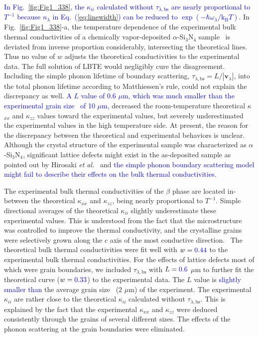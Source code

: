 \documentclass[twocolumn,amsmath,amssymb,a4paper,prb,superscriptaddress,floatfix]{revtex4-1}
\begin{document}
\textcolor {blue}{In Fig.~\ref{fig:Fig1_338}, the $\kappa_{ii}$ calculated
without $\tau_{\lambda,\text{bs}}$ are nearly proportional to $T^{-1}$ because
$n_\lambda$ in Eq.~(\ref{eq:linewidth}) can be reduced to
$\exp(-\hbar\omega_\lambda/\mathrm{k_B}T)$.} In Fig.~\ref{fig:Fig1_338}-a, the
temperature dependence of the experimental bulk thermal conductivities of a
chemically vapor-deposited $\alpha$-Si$_3$N$_4$ sample~\cite{hirai} is deviated
from inverse proportion considerably, intersecting the theoretical lines.  Thus
no value of $w$ adjusts the theoretical conductivities to the experimental
data.  The full solution of LBTE would negligibly cure the disagreement.
Including the simple phonon lifetime of boundary scattering,
$\tau_{\lambda,\text{bs}}=L/|\mathbf{v}_\lambda|$, into the total phonon
lifetime according to Matthiessen's rule, could not explain the discrepancy as
well.  \textcolor {blue}{A $L$ value of 0.6 $\mu\text{m}$, which was much
smaller than the experimental grain size~\cite{hirai} of 10 $\mu\text{m}$,} decreased the
room-temperature theoretical $\kappa$$_{xx}$ and $\kappa$$_{zz}$ values toward
the experimental values, but severely underestimated the experimental values in
the high temperature side.  At present, the reason for the discrepancy between
the theoretical and experimental behaviors is unclear.  Although the crystal
structure of the experimental sample was characterized as $\alpha$-Si$_3$N$_4$,
significant lattice defects might exist in the as-deposited sample as pointed
out by Hirosaki {\it et al.}~\cite{hirosaki-md} and \textcolor{blue}{the simple
phonon boundary scattering model might fail to describe their effects on the
bulk thermal conductivities.} 

The experimental bulk thermal conductivities of the $\beta$ phase are located
in-between the theoretical $\kappa$$_{xx}$ and  $\kappa$$_{zz}$, being nearly
proportional to $T^{-1}$. Simple directional averages of the theoretical
$\kappa_{ii}$ slightly underestimate these experimental values.  This is
understood from the fact that the microstructure was controlled to improve the
thermal conductivity, and the crystalline grains were selectively grown along
the $c$ axis of the most conductive direction.~\cite{hirosaki} The theoretical
bulk thermal conductivities were fit well with $w=\textcolor{blue}{0.44}$  to
the experimental bulk thermal conductivities.  For the effects of lattice
defects most of which were grain boundaries, we included
$\tau_{\lambda,\text{bs}}$ with $L = \textcolor{blue}{0.6}$ $\mu\text{m}$ to
further fit the theoretical curve ($w=\textcolor{blue}{0.33}$) to the
experimental data.  The $L$ value is \textcolor{blue}{slightly smaller than}
the average grain size~\cite{hirosaki} (2 $\mu\text{m}$) of the experiment.
The experimental $\kappa$$_{ii}$ are rather close to the theoretical
$\kappa$$_{ii}$ calculated without $\tau_{\lambda,\text{bs}}$.  This is
explained by the fact that the experimental $\kappa$$_{xx}$ and
$\kappa$$_{zz}$ were deduced consistently through the grains of several
different sizes. The effects of the phonon scattering at the grain boundaries
were eliminated.~\cite{li}
\end{document}
